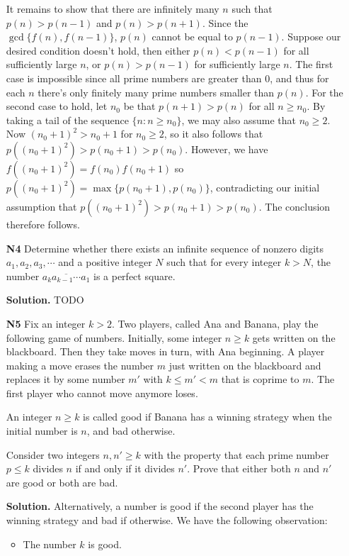 \documentclass[11pt,a4paper]{article}
\begin{document}
\begin{enumerate}
	It remains to show that there are infinitely many $n$ such that $p(n)>p(n-1)$ and $p(n)>p(n+1)$. 
	Since the $\gcd\{f(n), f(n-1)\}$, $p(n)$ cannot be equal to $p(n-1)$. 
	Suppose our desired condition doesn't hold, then either $p(n)<p(n-1)$ for all sufficiently large $n$, or $p(n)>p(n-1)$ for sufficiently large $n$. The first case is impossible since all prime numbers are greater than 0, and thus for each $n$ there's only finitely many prime numbers smaller than $p(n)$. 
	For the second case to hold, let $n_0$ be that $p(n+1)>p(n)$ for all $n\ge n_0$. 
	By taking a tail of the sequence $\{n: n\ge n_0\}$, we may also assume that $n_0\ge 2$. 
	Now $(n_0+1)^2>n_0+1$ for $n_0\ge 2$, so it also follows that $p((n_0+1)^2)>p(n_0+1)>p(n_0)$. 
	However, we have $f((n_0+1)^2)=f(n_0)f(n_0+1)$ so $p((n_0+1)^2)=\max\{p(n_0+1), p(n_0)\}$, contradicting our initial assumption that $p((n_0+1)^2)>p(n_0+1)>p(n_0)$. The conclusion therefore follows. 
	
	\item[\textbf{N4}] Determine whether there exists an infinite sequence of nonzero digits $a_1 , a_2 , a_3 , \cdots $ and a positive integer $N$ such that for every integer $k > N$, the number $\overline{a_k a_{k-1}\cdots a_1 }$ is a perfect square.
	
	\textbf{Solution.} TODO
	
	\item[\textbf{N5}] Fix an integer $k>2$. Two players, called Ana and Banana, play the following game of numbers. Initially, some integer $n \ge k$ gets written on the blackboard. Then they take moves in turn, with Ana beginning. A player making a move erases the number $m$ just written on the blackboard and replaces it by some number $m'$ with $k \le m' < m$ that is coprime to $m$. The first player who cannot move anymore loses.
	
	An integer $n \ge k $ is called good if Banana has a winning strategy when the initial number is $n$, and bad otherwise.
	
	Consider two integers $n,n' \ge k$ with the property that each prime number $p \le k$ divides $n$ if and only if it divides $n'$. Prove that either both $n$ and $n'$ are good or both are bad.
	
	\textbf{Solution.} Alternatively, a number is good if the second player has the winning strategy and bad if otherwise. We have the following observation: 
	
	\begin{itemize} 
		\item The number $k$ is good. 
		

\end{itemize}
\end{enumerate}
\end{document}
